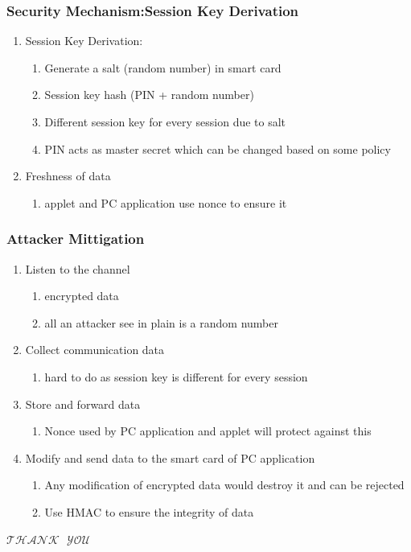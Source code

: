 \documentclass{beamer}
\begin{document}
  \begin{frame}
    \frametitle{Security Mechanism:Session Key Derivation}
    	\begin{enumerate}
		\item Session Key Derivation:
			\begin{enumerate}[-]
				\item Generate a salt (random number) in smart card
				\item Session key hash (PIN + random number)
				\item Different session key for every session due to salt
				\item PIN acts as master secret which can be changed based on some policy
			\end{enumerate}
		\item Freshness of data
			\begin{enumerate}[-]
				\item applet and PC application use nonce to ensure it
			\end{enumerate}
	\end{enumerate}
  \end{frame}  
  
  
  \begin{frame}
    \frametitle{Attacker Mittigation}
    	\begin{enumerate}
  	\item Listen to the channel
		\begin{enumerate} [$\implies$]		\pause
			\item  encrypted data
			\item all an attacker see in plain is a random number
		\end {enumerate}
		\pause 
 	\item Collect communication data  \pause 
		\begin{enumerate} [$\implies$]
			\item hard to do as session key is different for every session
		\end {enumerate}
		\pause 
	\item Store and forward data  \pause 
		\begin{enumerate} [$\implies$]
			\item  Nonce used by PC application and applet will protect against this
		\end {enumerate}
		\pause 
	\item Modify and send data to the smart card of PC application \pause 
		\begin{enumerate} [$\implies$]
			\item  Any modification of encrypted data would destroy it and can be rejected
			\item Use HMAC to ensure the integrity of data
		\end {enumerate}
	\end {enumerate}
  \end{frame}
  
  
  \begin{frame}
    \begin{center}
      \huge $\mathcal{THANK ~~~ YOU}$\\ \ \\ \ \\      
    \end{center}
  \end{frame}
\end{document}
